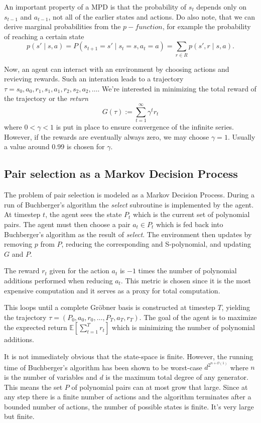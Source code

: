 \documentclass{article}
\theoremstyle{changedot}
\theoremstyle{changedotbreak}
\theoremstyle{nonumberplain}
\newcommand{\m}{\mathbb}
\begin{document}
An important property of a MPD is that the probability of $s_{t}$ depends only on $s_{t-1}$ and $a_{t-1}$, not all of the earlier states and actions. Do also note, that we can derive marginal probabilities from the $p-function$, for example the probability of reaching a certain state \[p(s' \mid s, a) = P(s_{t+1} = s' \mid s_{t} = s, a_{t} = a) = \sum_{r \in R} p(s', r \mid s, a).\]

Now, an agent can interact with an environment by choosing actions and revieving rewards. Such an interation leads to a trajectory $\tau = s_{0}, a_{0}, r_{1}, s_{1}, a_{1}, r_{2}, s_{2}, a_{2}, \dots$. We're interested in minimizing the total reward of the trajectory or the \emph{return} \[G(\tau) := \sum_{t=1}^{\infty} \gamma^{t} r_{t}\] where $0 < \gamma < 1$ is put in place to ensure convergence of the infinite series. However, if the rewards are eventually always zero, we may choose $\gamma = 1$. Usually a value around 0.99 is chosen for $\gamma$.

\subsection{Pair selection as a Markov Decision Process}
The problem of pair selection is modeled as a Markov Decision Process. During a run of Buchberger's algorithm the \emph{select} subroutine is implemented by the agent. At timestep $t$, the agent sees the state $P_{t}$ which is the current set of polynomial pairs. The agent must then choose a pair $a_{t} \in P_{t}$ which is fed back into Buchberger's algorithm as the result of \emph{select}. The environment then updates by removing $p$ from $P$, reducing the corresponding and S-polynomial, and updating $G$ and $P$.

The reward $r_{t}$ given for the action $a_{t}$ is $-1$ times the number of polynomial additions performed when reducing $a_{t}$. This metric is chosen since it is the most expensive computation and it serves as a proxy for total computation.

This loops until a complete Gröbner basis is constructed at timestep $T$, yielding the trajectory $\tau = (P_{0}, a_{0}, r_{0}, \dots, P_{T}, a_{T}, r_{T})$. The goal of the agent is to maximize the exprected return $\m E[\sum_{t=1}^{T} r_{t}]$ which is minimizing the number of polynomial additions.

It is not immediately obvious that the state-space is finite. However, the running time of Buchberger's algorithm has been shown to be worst-case $d^{2^{n+\mathcal{O}(1)}}$ where $n$ is the number of variables and $d$ is the maximum total degree of any generator. This means the set $P$ of polynomial pairs can at most grow that large. Since at any step there is a finite number of actions and the algorithm terminates after a bounded number of actions, the number of possible states is finite. It's very large but finite.
\end{document}
